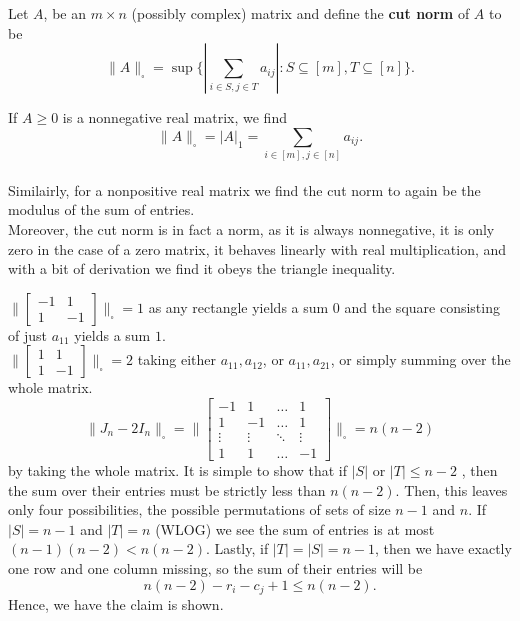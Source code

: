 \begin{definition}
	Let \(A\), be an \(m \times n\) (possibly complex) matrix and define the \textbf{cut norm} of \(A\) to be \[
	\|A\|_{\square} = \sup \{ \left| \sum_{i \in S, j \in T}^{}a_{ij}\right|  : S \subseteq \left[ m \right] , T \subseteq \left[ n \right]   \}
	.\]
\end{definition}
\begin{remark}
	If \(A \ge 0\) is a nonnegative real matrix, we find \[\|A\|_{\square} = \left| A \right| _{1} = \sum_{i \in \left[ m \right] , j \in \left[ n \right] } a_{ij}.\]\\
	Similairly, for a nonpositive real matrix we find the cut norm to again be the modulus of the sum of entries.\\
Moreover, the cut norm is in fact a norm, as it is always nonnegative, it is only zero in the case of a zero matrix, it behaves linearly with real multiplication, and with a bit of derivation we find it obeys the triangle inequality.
\end{remark}
\begin{example}
	\(\| \begin{bmatrix} -1&1\\1&-1 \end{bmatrix}  \|_{\square} = 1 \) as any rectangle yields a sum \(0\) and the square consisting of just \(a_{11}\) yields a sum \(1\).\\
	\(\| \begin{bmatrix} 1&1\\
	1&-1\end{bmatrix}  \|_{\square} = 2 \) taking either \(a_{11}, a_{12}\), or \(a_{11}, a_{21}\), or simply summing over the whole matrix.\\
	\[
		\| J_{n} - 2I_{n} \|_{\square} = \|\begin{bmatrix} -1 & 1 & \ldots & 1\\
		1 & -1 & \ldots & 1\\
	\vdots & \vdots & \ddots & \vdots\\
1 & 1 & \ldots & -1\end{bmatrix} \|_{\square} = n\left( n-2 \right)
	\] by taking the whole matrix. It is simple to show that if \(\left| S \right| \) or \(\left| T \right| \le n-2\) , then the sum over their entries must be strictly less than \(n\left( n-2 \right) \). Then, this leaves only four possibilities, the possible permutations of sets of size \(n-1\) and \(n\). If \(\left| S \right| = n-1\) and \(\left| T \right|  = n\) (WLOG) we see the sum of entries is at most \(\left( n-1 \right) \left( n-2 \right) < n\left( n-2 \right) \). Lastly, if \(\left| T \right| = \left| S \right| = n-1\), then we have exactly one row and one column missing, so the sum of their entries will be \[
	n\left( n-2 \right) - r_{i} - c_{j} + 1 \le n\left( n-2 \right)
	.\] Hence, we have the claim is shown.
\end{example}
